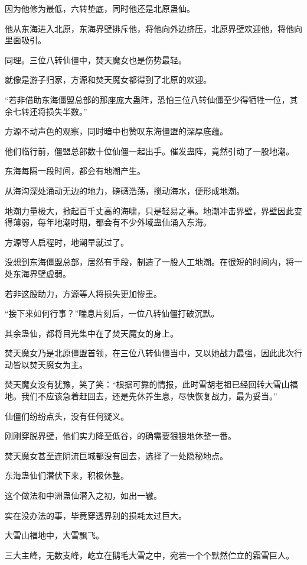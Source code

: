 \begin{this_body}
因为他修为最低，六转垫底，同时他还是北原蛊仙。

他从东海进入北原，东海界壁排斥他，将他向外边挤压，北原界壁欢迎他，将他向里面吸引。

同理。三位八转仙僵中，焚天魔女也是伤势最轻。

就像是游子归家，方源和焚天魔女都得到了北原的欢迎。

“若非借助东海僵盟总部的那座庞大蛊阵，恐怕三位八转仙僵至少得牺牲一位，其余七转还将损失半数。”

方源不动声色的观察，同时暗中也赞叹东海僵盟的深厚底蕴。

他们临行前，僵盟总部数十位仙僵一起出手。催发蛊阵，竟然引动了一股地潮。

东海每隔一段时间，都会有地潮产生。

从海沟深处涌动无边的地力，磅礴浩荡，搅动海水，便形成地潮。

地潮力量极大，掀起百千丈高的海啸，只是轻易之事。地潮冲击界壁，界壁因此变得薄弱，每年地潮时期，都会有不少外域蛊仙涌入东海。

方源等人启程时，地潮早就过了。

没想到东海僵盟总部，居然有手段，制造了一股人工地潮。在很短的时间内，将一处东海界壁虚弱。

若非这股助力，方源等人将损失更加惨重。

“接下来如何行事？”喘息片刻后，一位八转仙僵打破沉默。

其余蛊仙，都将目光集中在了焚天魔女的身上。

焚天魔女乃是北原僵盟首领，在三位八转仙僵当中，又以她战力最强，因此此次行动皆以焚天魔女为主。

焚天魔女没有犹豫，笑了笑：“根据可靠的情报，此时雪胡老祖已经回转大雪山福地。我们不应该急着赶回去，还是先休养生息，尽快恢复战力，最为妥当。”

仙僵们纷纷点头，没有任何疑义。

刚刚穿脱界壁，他们实力降至低谷，的确需要狠狠地休整一番。

焚天魔女甚至连阴流巨城都没有回去，选择了一处隐秘地点。

东海蛊仙们潜伏下来，积极休整。

这个做法和中洲蛊仙潜入之初，如出一辙。

实在没办法的事，毕竟穿透界别的损耗太过巨大。

大雪山福地中，大雪飘飞。

三大主峰，无数支峰，屹立在鹅毛大雪之中，宛若一个个默然伫立的霜雪巨人。


\end{this_body}
